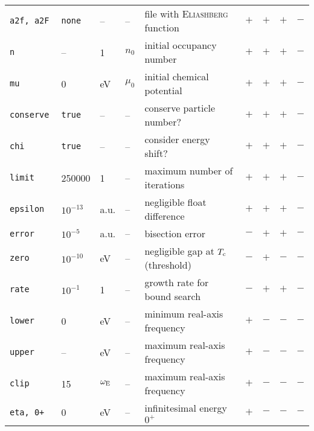 \documentclass[a4paper]{article}
\def\sub#1{\sb{\mathrm{#1}}}
\newlength\gap
\begin{document}
\begin{table}[b]
\begin{tabular}{*9l}
         \tt a2f, a2F      & \tt none    & --               & --                  & file with \textsc{Eliashberg} function     & $+$ & $+$ & $+$ & $-$ \\[\gap]
         \tt n             & --          & 1                & $n_0$               & initial occupancy number                   & $+$ & $+$ & $+$ & $-$ \\
         \tt mu            & 0           & eV               & $\mu_0$             & initial chemical potential                 & $+$ & $+$ & $+$ & $-$ \\
         \tt conserve      & \tt true    & --               & --                  & conserve particle number?                  & $+$ & $+$ & $+$ & $-$ \\
         \tt chi           & \tt true    & --               & --                  & consider energy shift?                     & $+$ & $+$ & $+$ & $-$ \\[\gap]
         \tt limit         & 250000      & 1                & --                  & maximum number of iterations               & $+$ & $+$ & $+$ & $-$ \\[\gap]
         \tt epsilon       & $10^{-13}$  & a.u.             & --                  & negligible float difference                & $+$ & $+$ & $+$ & $-$ \\
         \tt error         & $10^{-5}$   & a.u.             & --                  & bisection error                            & $-$ & $+$ & $+$ & $-$ \\
         \tt zero          & $10^{-10}$  & eV               & --                  & negligible gap at $T \sub c$ (threshold)   & $-$ & $+$ & $-$ & $-$ \\
         \tt rate          & $10^{-1}$   & 1                & --                  & growth rate for bound search               & $-$ & $+$ & $+$ & $-$ \\[\gap]
         \tt lower         & 0           & eV               & --                  & minimum real-axis frequency                & $+$ & $-$ & $-$ & $-$ \\
         \tt upper         & --          & eV               & --                  & maximum real-axis frequency                & $+$ & $-$ & $-$ & $-$ \\
         \tt clip          & 15          & $\omega \sub E$  & --                  & maximum real-axis frequency                & $+$ & $-$ & $-$ & $-$ \\
         \tt eta, 0+       & 0           & eV               & --                  & infinitesimal energy $0^+$                 & $+$ & $-$ & $-$ & $-$ \\

\end{tabular}
\end{table}
\end{document}
